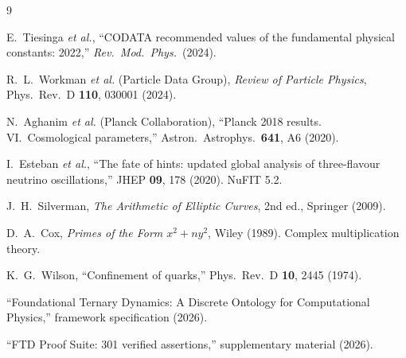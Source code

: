 \documentclass[12pt]{article}
\theoremstyle{definition}
\theoremstyle{remark}
\begin{document}
\begin{thebibliography}{9}

E.~Tiesinga \textit{et al.},
``CODATA recommended values of the fundamental physical constants: 2022,''
\textit{Rev.\ Mod.\ Phys.}\ (2024).

R.~L.~Workman \textit{et al.} (Particle Data Group),
\textit{Review of Particle Physics},
Phys.\ Rev.\ D \textbf{110}, 030001 (2024).

N.~Aghanim \textit{et al.} (Planck Collaboration),
``Planck 2018 results. VI.\ Cosmological parameters,''
Astron.\ Astrophys.\ \textbf{641}, A6 (2020).

I.~Esteban \textit{et al.},
``The fate of hints: updated global analysis of three-flavour neutrino oscillations,''
JHEP \textbf{09}, 178 (2020). NuFIT 5.2.

J.~H.~Silverman,
\textit{The Arithmetic of Elliptic Curves}, 2nd ed., Springer (2009).

D.~A.~Cox,
\textit{Primes of the Form $x^2 + ny^2$}, Wiley (1989).
Complex multiplication theory.

K.~G.~Wilson,
``Confinement of quarks,''
Phys.\ Rev.\ D \textbf{10}, 2445 (1974).

``Foundational Ternary Dynamics: A Discrete Ontology for Computational Physics,''
framework specification (2026).

``FTD Proof Suite: 301 verified assertions,''
supplementary material (2026).

\end{thebibliography}
\end{document}
